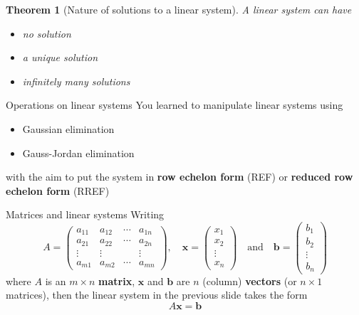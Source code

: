 \documentclass{beamer}
\def\bb{\mathbf{b}}
\def\bx{\mathbf{x}}
\newtheorem{importanttheorem}[theorem]{Theorem}
\begin{document}
\begin{frame}
\begin{importanttheorem}[Nature of solutions to a linear system]
\label{th:nature_solutions_linear_system}
A linear system can have
\begin{itemize}
	\item no solution
	\item a unique solution
	\item infinitely many solutions
\end{itemize}
\end{importanttheorem}
\end{frame}


\begin{frame}{Operations on linear systems}
You learned to manipulate linear systems using
\begin{itemize}
	\item Gaussian elimination
	\item Gauss-Jordan elimination
\end{itemize}
with the aim to put the system in \textbf{row echelon form} (REF) or \textbf{reduced row echelon form} (RREF) 
\end{frame}


\begin{frame}{Matrices and linear systems}
Writing
$$
A=
\begin{pmatrix}
a_{11} & a_{12} & \cdots & a_{1n} \\
a_{21} & a_{22} & \cdots & a_{2n} \\
\vdots &\vdots & & \vdots \\
a_{m1} & a_{m2} & \cdots & a_{mn}
\end{pmatrix},\quad
\bx=
\begin{pmatrix}
x_1\\ x_2 \\ \vdots \\ x_n
\end{pmatrix}
\quad\textrm{and}\quad
\bb=
\begin{pmatrix}
b_1\\ b_2 \\ \vdots \\ b_n
\end{pmatrix}
$$
where $A$ is an $m\times n$ \textbf{matrix}, $\bx$ and $\bb$ are $n$ (column) \textbf{vectors} (or $n\times 1$ matrices), then the linear system in the previous slide takes the form
$$
A\bx=\bb  
$$
\end{frame}
\end{document}
